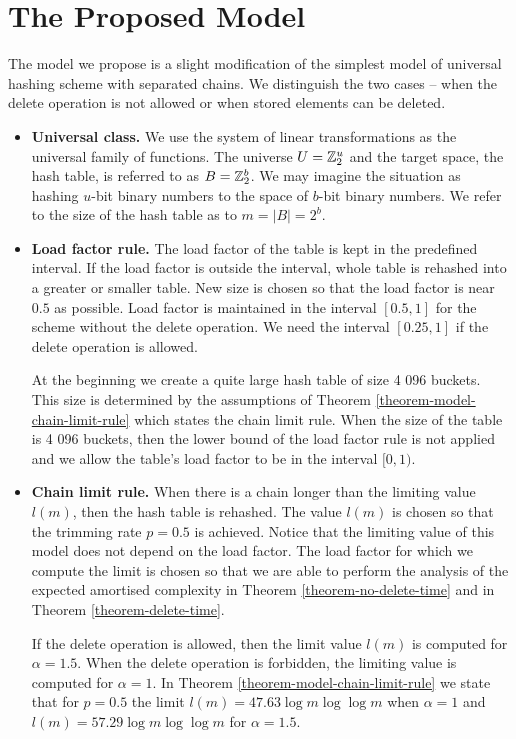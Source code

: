 \section{The Proposed Model}
\label{section-proposed-model}
The model we propose is a slight modification of the simplest model of universal hashing scheme with separated chains. We distinguish the two cases -- when the delete operation is not allowed or when stored elements can be deleted.
\begin{itemize}
\item \textbf{Universal class.} We use the system of linear transformations as the universal family of functions. The universe $U = \mathbb{Z}_{2}^{u}$ and the target space, the hash table, is referred to as $B = \mathbb{Z}_{2}^{b}$. We may imagine the situation as hashing $u$-bit binary numbers to the space of $b$-bit binary numbers. We refer to the size of the hash table as to $m = |B| = 2 ^ b$.

\item \textbf{Load factor rule.} The load factor of the table is kept in the predefined interval. If the load factor is outside the interval, whole table is rehashed into a greater or smaller table. New size is chosen so that the load factor is near $0.5$ as possible. Load factor is maintained in the interval $\left[0.5, 1\right]$ for the scheme without the delete operation. We need the interval $\left[0.25, 1\right]$ if the delete operation is allowed.

At the beginning we create a quite large hash table of size 4 096 buckets. This size is determined by the assumptions of Theorem \ref{theorem-model-chain-limit-rule} which states the chain limit rule. When the size of the table is 4 096 buckets, then the lower bound of the load factor rule is not applied and we allow the table's load factor to be in the interval $[0, 1)$.

\item \textbf{Chain limit rule.} When there is a chain longer than the limiting value $l(m)$, then the hash table is rehashed. The value $l(m)$ is chosen so that the trimming rate $p = 0.5$ is achieved. Notice that the limiting value of this model does not depend on the load factor. The load factor for which we compute the limit is chosen so that we are able to perform the analysis of the expected amortised complexity in Theorem \ref{theorem-no-delete-time} and in Theorem \ref{theorem-delete-time}.

If the delete operation is allowed, then the limit value $l(m)$ is computed for $\alpha = 1.5$. When the delete operation is forbidden, the limiting value is computed for $\alpha = 1$. In Theorem \ref{theorem-model-chain-limit-rule} we state that for $p = 0.5$ the limit $l(m) = 47.63 \log m \log \log m$ when $\alpha = 1$ and $l(m) = 57.29 \log m \log \log m$ for $\alpha = 1.5$.

\end{itemize}

